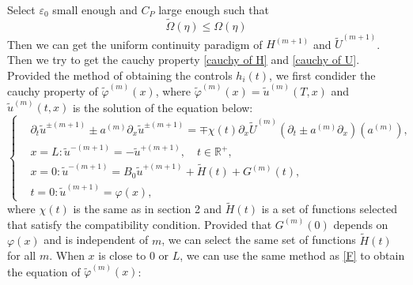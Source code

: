 \documentclass[a4paper,reqno,11pt]{amsart}
\numberwithin{equation}{section} %
\begin{document}
Select $\varepsilon _0$ small enough and $C_P$ large enough such that
$$
\widetilde{\Omega }(\eta )\leqslant \Omega (\eta )
$$
Then we can get the uniform continuity paradigm of $H^{(m+1)}$ and $\tilde{U}^{(m+1)}$.
Then we try to get the cauchy property \eqref{cauchy of H} and \eqref{cauchy of U}. Provided the method of obtaining the controls $h_i(t)$, we first condider the cauchy property of $\tilde{\varphi }^{(m)}(x)$, where $\tilde{\varphi }^{(m)}(x)=\tilde{u}^{(m)}(T,x)$ and $\tilde{u}^{(m)}(t,x)$ is the solution of the equation below:
$$
\begin{cases}
	&		\partial _t\widetilde{u}^{\pm (m+1)}\pm a^{(m)}\partial _x\widetilde{u}^{\pm (m+1)}=\mp \chi \left( t \right) \partial _x\widetilde{U}^{(m)}\left( \partial _t\pm a^{(m)}\partial _x \right) \left( a^{(m)} \right) ,\\
	&		x=L:\widetilde{u}^{-(m+1)}=-\widetilde{u}^{+(m+1)},\quad t\in \mathbb{R} ^+,\\
	&		x=0:\widetilde{u}^{-(m+1)}=B_0\widetilde{u}^{+(m+1)}+\widetilde{H}(t)+G^{\left( m \right)}\left( t \right) ,\\
	&		t=0:\widetilde{u}^{(m+1)}=\varphi \left( x \right) ,
\end{cases}
$$
where $\chi (t)$ is the same as in section 2 and $\widetilde{H}(t)$ is a set of functions selected that satisfy the compatibility condition.
Provided that $G^{\left( m \right)}\left( 0 \right)$ depends on $\varphi (x)$ and is independent of $m$, we can select the same set of functions $\widetilde{H}(t)$ for all $m$.
When $x$ is close to $0$ or $L$, we can use the same method as \eqref{F} to obtain the equation of $\tilde{\varphi }^{(m)}(x)$:
\end{document}

